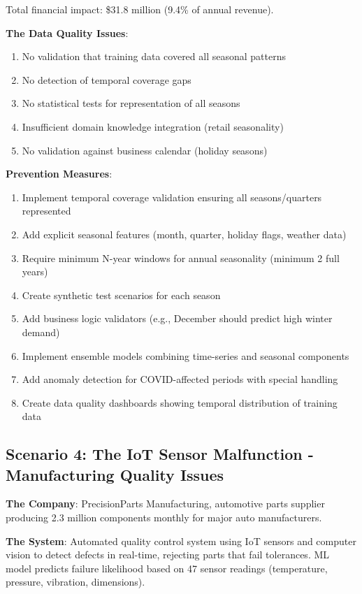 Total financial impact: \$31.8 million (9.4\% of annual revenue).

\textbf{The Data Quality Issues}:
\begin{enumerate}
    \item No validation that training data covered all seasonal patterns
    \item No detection of temporal coverage gaps
    \item No statistical tests for representation of all seasons
    \item Insufficient domain knowledge integration (retail seasonality)
    \item No validation against business calendar (holiday seasons)
\end{enumerate}

\textbf{Prevention Measures}:
\begin{enumerate}
    \item Implement temporal coverage validation ensuring all seasons/quarters represented
    \item Add explicit seasonal features (month, quarter, holiday flags, weather data)
    \item Require minimum N-year windows for annual seasonality (minimum 2 full years)
    \item Create synthetic test scenarios for each season
    \item Add business logic validators (e.g., December should predict high winter demand)
    \item Implement ensemble models combining time-series and seasonal components
    \item Add anomaly detection for COVID-affected periods with special handling
    \item Create data quality dashboards showing temporal distribution of training data
\end{enumerate}

\subsection{Scenario 4: The IoT Sensor Malfunction - Manufacturing Quality Issues}

\textbf{The Company}: PrecisionParts Manufacturing, automotive parts supplier producing 2.3 million components monthly for major auto manufacturers.

\textbf{The System}: Automated quality control system using IoT sensors and computer vision to detect defects in real-time, rejecting parts that fail tolerances. ML model predicts failure likelihood based on 47 sensor readings (temperature, pressure, vibration, dimensions).

